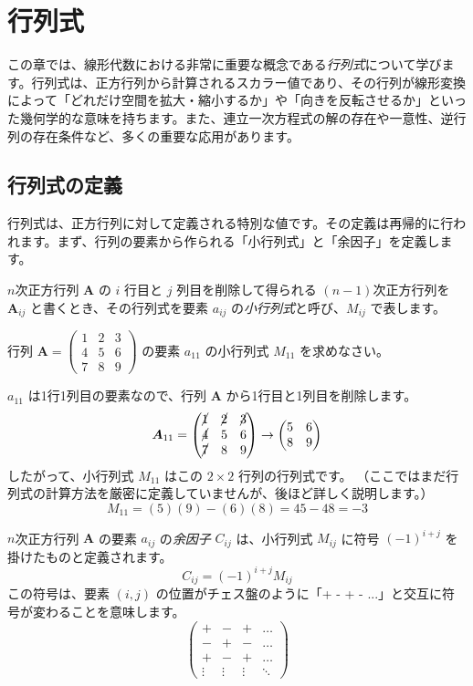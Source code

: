 \section{行列式} \setcounter{ex}{0}

この章では、線形代数における非常に重要な概念である\emph{行列式}について学びます。行列式は、正方行列から計算されるスカラー値であり、その行列が線形変換によって「どれだけ空間を拡大・縮小するか」や「向きを反転させるか」といった幾何学的な意味を持ちます。また、連立一次方程式の解の存在や一意性、逆行列の存在条件など、多くの重要な応用があります。

\subsection{行列式の定義}

行列式は、正方行列に対して定義される特別な値です。その定義は再帰的に行われます。まず、行列の要素から作られる「小行列式」と「余因子」を定義します。

\begin{dfn}[小行列式]
$n$次正方行列 $\bm{A}$ の $i$ 行目と $j$ 列目を削除して得られる $(n-1)$次正方行列を $\bm{A}_{ij}$ と書くとき、その行列式を要素 $a_{ij}$ の\emph{小行列式}と呼び、$M_{ij}$ で表します。
\end{dfn}

\begin{ex}
行列 $\bm{A} = \begin{pmatrix} 1 & 2 & 3 \\ 4 & 5 & 6 \\ 7 & 8 & 9 \end{pmatrix}$ の要素 $a_{11}$ の小行列式 $M_{11}$ を求めなさい。

$a_{11}$ は1行1列目の要素なので、行列 $\bm{A}$ から1行目と1列目を削除します。
\[ \bm{A}_{11} = \begin{pmatrix} \cancel{1} & \cancel{2} & \cancel{3} \\ \cancel{4} & 5 & 6 \\ \cancel{7} & 8 & 9 \end{pmatrix} \rightarrow \begin{pmatrix} 5 & 6 \\ 8 & 9 \end{pmatrix} \]
したがって、小行列式 $M_{11}$ はこの $2 \times 2$ 行列の行列式です。
（ここではまだ行列式の計算方法を厳密に定義していませんが、後ほど詳しく説明します。）
\[ M_{11} = (5)(9) - (6)(8) = 45 - 48 = -3 \]
\end{ex}

\begin{dfn}[余因子]
$n$次正方行列 $\bm{A}$ の要素 $a_{ij}$ の\emph{余因子} $C_{ij}$ は、小行列式 $M_{ij}$ に符号 $(-1)^{i+j}$ を掛けたものと定義されます。
\[ C_{ij} = (-1)^{i+j}M_{ij} \]
この符号は、要素 $(i, j)$ の位置がチェス盤のように「+ - + - ...」と交互に符号が変わることを意味します。
\[
\begin{pmatrix}
+ & - & + & \dots \\
- & + & - & \dots \\
+ & - & + & \dots \\
\vdots & \vdots & \vdots & \ddots
\end{pmatrix}
\]
\end{dfn}

